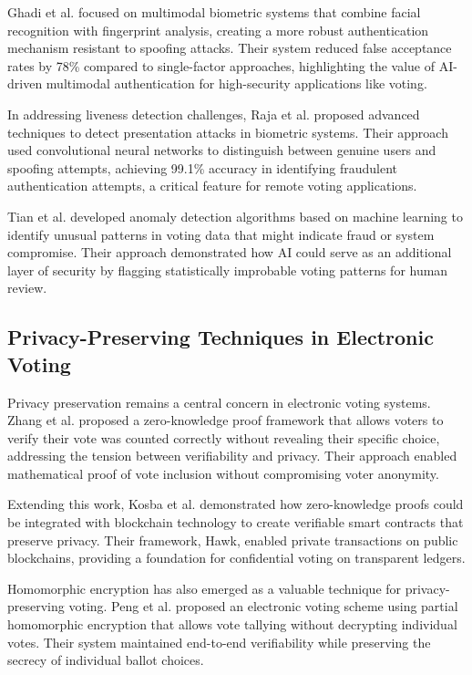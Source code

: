 \documentclass[conference]{IEEEtran}
\begin{document}
Ghadi et al. \cite{b12} focused on multimodal biometric systems that combine facial recognition with fingerprint analysis, creating a more robust authentication mechanism resistant to spoofing attacks. Their system reduced false acceptance rates by 78\% compared to single-factor approaches, highlighting the value of AI-driven multimodal authentication for high-security applications like voting.

In addressing liveness detection challenges, Raja et al. \cite{b13} proposed advanced techniques to detect presentation attacks in biometric systems. Their approach used convolutional neural networks to distinguish between genuine users and spoofing attempts, achieving 99.1\% accuracy in identifying fraudulent authentication attempts, a critical feature for remote voting applications.

Tian et al. \cite{b14} developed anomaly detection algorithms based on machine learning to identify unusual patterns in voting data that might indicate fraud or system compromise. Their approach demonstrated how AI could serve as an additional layer of security by flagging statistically improbable voting patterns for human review.

\subsection{Privacy-Preserving Techniques in Electronic Voting}
Privacy preservation remains a central concern in electronic voting systems. Zhang et al. \cite{b15} proposed a zero-knowledge proof framework that allows voters to verify their vote was counted correctly without revealing their specific choice, addressing the tension between verifiability and privacy. Their approach enabled mathematical proof of vote inclusion without compromising voter anonymity.

Extending this work, Kosba et al. \cite{b16} demonstrated how zero-knowledge proofs could be integrated with blockchain technology to create verifiable smart contracts that preserve privacy. Their framework, Hawk, enabled private transactions on public blockchains, providing a foundation for confidential voting on transparent ledgers.

Homomorphic encryption has also emerged as a valuable technique for privacy-preserving voting. Peng et al. \cite{b17} proposed an electronic voting scheme using partial homomorphic encryption that allows vote tallying without decrypting individual votes. Their system maintained end-to-end verifiability while preserving the secrecy of individual ballot choices.
\end{document}
